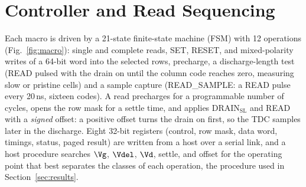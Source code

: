 \section{Controller and Read Sequencing}
\label{sec:ctrl}
Each macro is driven by a 21-state finite-state machine (FSM) with 12 operations (Fig.~\ref{fig:macro}): single and
complete reads, SET, RESET, and mixed-polarity writes of a 64-bit word into the selected rows,
precharge, a discharge-length test (READ pulsed with the drain on until the column code reaches
zero, measuring slow or pristine cells) and a sample capture (READ\_SAMPLE: a READ pulse every 20\,ns, sixteen codes). A read precharges for
a programmable number of cycles, opens the row mask for a settle time, and applies
DRAIN$_\mathrm{SL}$ and READ with a \emph{signed} offset: a positive offset turns the drain on
first, so the TDC samples later in the discharge. Eight 32-bit
registers (control, row mask, data word, timings, status, paged result) are written from a host
over a serial link, and a host procedure searches $\Vg$, $\Vdel$, $\Vd$, settle, and offset for
the operating point that best separates the classes of each operation, the procedure used in
Section~\ref{sec:results}.
